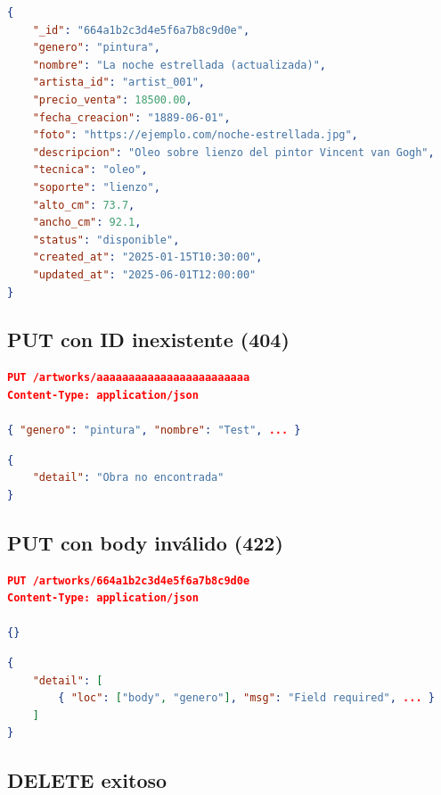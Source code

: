 \documentclass[12pt,a4paper]{article}
\begin{document}
\begin{lstlisting}[language=json, caption=Respuesta 200 OK]
{
    "_id": "664a1b2c3d4e5f6a7b8c9d0e",
    "genero": "pintura",
    "nombre": "La noche estrellada (actualizada)",
    "artista_id": "artist_001",
    "precio_venta": 18500.00,
    "fecha_creacion": "1889-06-01",
    "foto": "https://ejemplo.com/noche-estrellada.jpg",
    "descripcion": "Oleo sobre lienzo del pintor Vincent van Gogh",
    "tecnica": "oleo",
    "soporte": "lienzo",
    "alto_cm": 73.7,
    "ancho_cm": 92.1,
    "status": "disponible",
    "created_at": "2025-01-15T10:30:00",
    "updated_at": "2025-06-01T12:00:00"
}
\end{lstlisting}

\subsection{PUT con ID inexistente (404)}

\begin{lstlisting}[language=json, caption=Petición]
PUT /artworks/aaaaaaaaaaaaaaaaaaaaaaaa
Content-Type: application/json

{ "genero": "pintura", "nombre": "Test", ... }
\end{lstlisting}

\begin{lstlisting}[language=json, caption=Respuesta 404]
{
    "detail": "Obra no encontrada"
}
\end{lstlisting}

\subsection{PUT con body inválido (422)}

\begin{lstlisting}[language=json, caption=Petición]
PUT /artworks/664a1b2c3d4e5f6a7b8c9d0e
Content-Type: application/json

{}
\end{lstlisting}

\begin{lstlisting}[language=json, caption=Respuesta 422]
{
    "detail": [
        { "loc": ["body", "genero"], "msg": "Field required", ... }
    ]
}
\end{lstlisting}

\subsection{DELETE exitoso}
\end{document}
